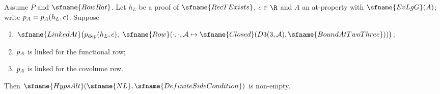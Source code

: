 \begin{theorem}\label{pf:stageU:unram}
Assume $P$ and $\sfname{RowRat}$. Let $h_L$ be a proof of $\sfname{RecTExists}$, $c\in\R$ and $A$ an at-property with
$\sfname{EvLgG}(A)$; write $p_{A}=p_{A}(h_L,c)$. Suppose
\begin{enumerate}[label=(\roman*)]
\item $\sfname{LinkedAt}\bigl(\stageUpd(h_L,c),\ \sfname{Row}(\cdot,\cdot,\stageUA\mapsto
\sfname{Closed}(D3(3,\stageUA),\sfname{BoundAtTwoThree}))\bigr)$;
\item $p_{A}$ is linked for the functional row;
\item $p_{A}$ is linked for the covolume row.
\end{enumerate}
Then $\sfname{HypsAlt}(\sfname{NL},\sfname{DefiniteSideCondition})$ is non-empty.
\end{theorem}

